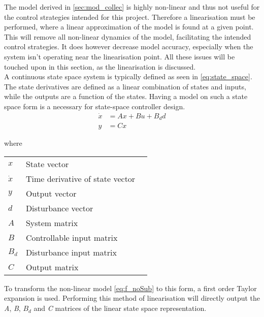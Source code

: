 







The model derived in \cref{sec:mod_collec} is highly non-linear and thus not useful for the control strategies intended for this project. Therefore a linearisation must be performed, where a linear approximation of the model is found at a given point. This will remove all non-linear dynamics of the model, facilitating the intended control strategies. It does however decrease model accuracy, especially when the system isn't operating near the linearisation point. All these issues will be touched upon in this section, as the linearisation is discussed.\\

A continuous state space system is typically defined as seen in \cref{eq:state_space}. The state derivatives are defined as a linear combination of states and inputs, while the outputs are a function of the states. Having a model on such a state space form is a necessary for state-space controller design.\\

\begin{equation} \label{eq:state_space}
	\begin{split}
		\dot{x} & = Ax + Bu + B_dd \\
		y 		& = Cx
	\end{split}
\end{equation}

where

\begin{center}
	\begin{tabular}{l p{8cm} l}
		$x$       & State vector                    &  \\
		$\dot{x}$ & Time derivative of state vector &  \\
		$y$       & Output vector                   &  \\
		$d$       & Disturbance vector              &  \\
		$A$       & System matrix                   &  \\
		$B$       & Controllable input matrix       &  \\
		$B_d$     & Disturbance input matrix        &  \\
		$C$       & Output matrix                   &
	\end{tabular}
\end{center}

To transform the non-linear model \cref{eq:f_noSub} to this form, a first order Taylor expansion is used. Performing this method of linearisation will directly output the \textit{A}, \textit{B}, \textit{$B_d$} and \textit{C} matrices of the linear state space representation.

